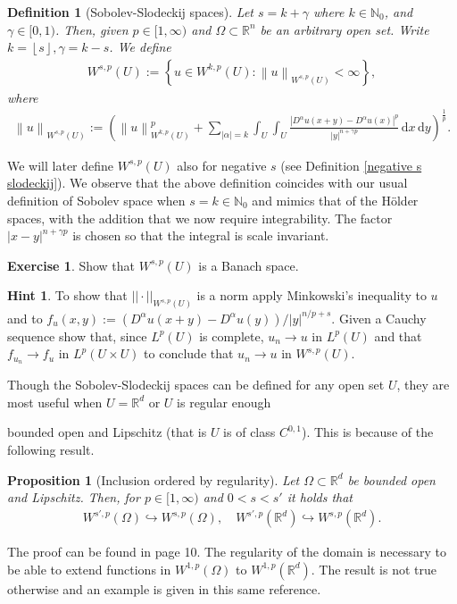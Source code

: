 \documentclass[
    a4paper,
    DIV=14,
    abstract=true,
    numbers=noenddot
]
{scrartcl}
\newtheorem{proposition}[theorem]{Proposition}
\newtheorem{definition}[theorem]{Definition}
\theoremstyle{definition}
\newtheorem{exercise}{Exercise}
\newtheorem*{hint}{Hint}
\newcommand{\set}[1]{\left\{#1\right\}}
\renewcommand{\norm}[1]{\left\lVert #1 \right\rVert}\renewcommand{\abs}[1]{\left| #1 \right|}
\renewcommand{\d}{\,\mathrm{d}}\newcommand{\dx}{\,\mathrm{d}x}
\newcommand{\N}{\mathbb{N}}
\newcommand{\R}{\mathbb{R}}
\begin{document}
\begin{definition}[Sobolev-Slodeckij spaces]\label{soledkij def}
  Let $s=k+\gamma$ where $k \in \N_0$, and $\gamma \in [0,1)$. Then, given  $p \in [1,\infty)$ and $\Omega  \subset \R^n$ be an arbitrary open set. Write $k=\left\lfloor s \right\rfloor,\gamma =k-s$.  We define
  \begin{align*}
    W^{s ,p}(U):= \set{u \in W^{k ,p}(U): \norm{u}_{W^{s,p}(U)}<\infty},
  \end{align*}
  where
  \begin{align}\label{norm def}
    \norm{u}_{W^{s,p}(U)}:= \left(\norm{u}_{W^{k,p}(U)}^p+ \sum_{\abs{\alpha}=k }\int_{U}\int_{U}\frac{\abs{D^\alpha u(x+y)-D^\alpha u(x)}^p}{\abs{y}^{n+\gamma p}}\d x \d y\right)^\frac{1}{p}.
  \end{align}
\end{definition}
We will later define $W^{s,p}(U)$ also for negative $s$ (see Definition \ref{negative s slodeckij}). We observe that the above definition coincides with our usual definition of Sobolev space when $s=k \in \N_0$ and  mimics that of the H\"older spaces, with the addition that we now require integrability. The factor $\abs{x-y}^{n+\gamma p}$ is chosen so that the integral is scale invariant.
\begin{exercise}
  Show that $W^{s,p}(U)$ is a Banach space.
\end{exercise}
\begin{hint}
  To show that $|| \cdot ||_{W^{s,p}(U)}$ is a norm apply Minkowski's inequality to $u$ and to $f_u(x,y):=(D^\alpha u(x+y)-D^\alpha  u(y))/|y|^{n/p+s}$. Given a Cauchy sequence show that, since $L^p(U)$ is complete, $u_n \to u$ in $L^p(U)$ and that $f_{u_n} \to f_u$ in $L^p(U\times U)$ to conclude that $u_n \to u$ in $W^{s,p}(U)$.
\end{hint}
Though the Sobolev-Slodeckij spaces can be defined for any open set $U$, they are most useful when $U=\R^d$ or $U$  is regular enough


bounded open and Lipschitz (that is $U$ is of class $C^{0,1}$). This is because of the following result.
\begin{proposition}[Inclusion ordered by regularity]
  Let  $\Omega \subset \R^d$ be bounded open and Lipschitz. Then, for $p \in [1,\infty)$ and $0<s<s'$ it holds that
  \begin{align*}
    W^{s',p}(\Omega )\hookrightarrow W^{s,p}(\Omega ), \quad W^{s',p}(\R^d)\hookrightarrow W^{s,p}(\R^d).
  \end{align*}
\end{proposition}
The proof can be found in \cite{di2012hitchhiker's} page 10. The regularity of the domain is necessary to be able to extend functions in $W^{1,p}(\Omega )$ to $W^{1,p}(\R^d)$. The result is not true otherwise and an example is given in this same reference.
\end{document}
